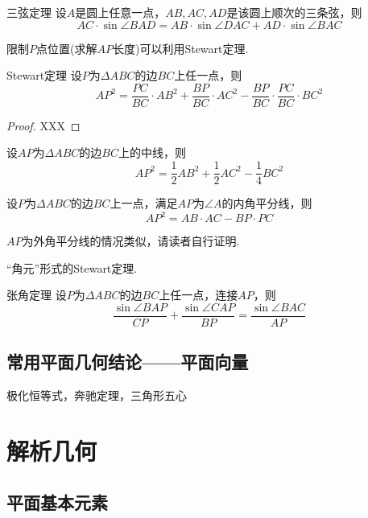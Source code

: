 \documentclass[lang=cn, zihao=5]{elegantbook}
\begin{document}
\begin{corollary}{三弦定理}
    设$A$是圆上任意一点，$AB,AC,AD$是该圆上顺次的三条弦，则$$AC \cdot \sin \angle BAD = AB \cdot \sin \angle DAC + AD \cdot \sin \angle BAC$$
\end{corollary}

限制$P$点位置(求解$AP$长度)可以利用Stewart定理.

\begin{theorem}{Stewart定理}
    设$P$为$\Delta ABC$的边$BC$上任一点，则$$AP^2=\frac{PC}{BC} \cdot AB^2 + \frac{BP}{BC} \cdot AC^2 - \frac{BP}{BC} \cdot \frac{PC}{BC} \cdot BC^2$$
\end{theorem}
\begin{proof}
    XXX
\end{proof}

\begin{corollary}
    设$AP$为$\Delta ABC$的边$BC$上的中线，则$$AP^2 = \frac{1}{2} AB^2 + \frac{1}{2} AC^2 - \frac{1}{4}BC^2$$
\end{corollary}
    
\begin{corollary}
    设$P$为$\Delta ABC$的边$BC$上一点，满足$AP$为$\angle A$的内角平分线，则$$AP^2 = AB \cdot AC - BP \cdot PC$$
\end{corollary}
\begin{remark}
    $AP$为外角平分线的情况类似，请读者自行证明.
\end{remark}

“角元”形式的Stewart定理.

\begin{theorem}{张角定理}
    设$P$为$\Delta ABC$的边$BC$上任一点，连接$AP$，则$$\frac{\sin \angle BAP}{CP} + \frac{\sin \angle CAP}{BP} = \frac{\sin \angle BAC}{AP}$$
\end{theorem}

\section{常用平面几何结论——平面向量}

极化恒等式，奔驰定理，三角形五心

\chapter{解析几何}

\section{平面基本元素}
\end{document}
